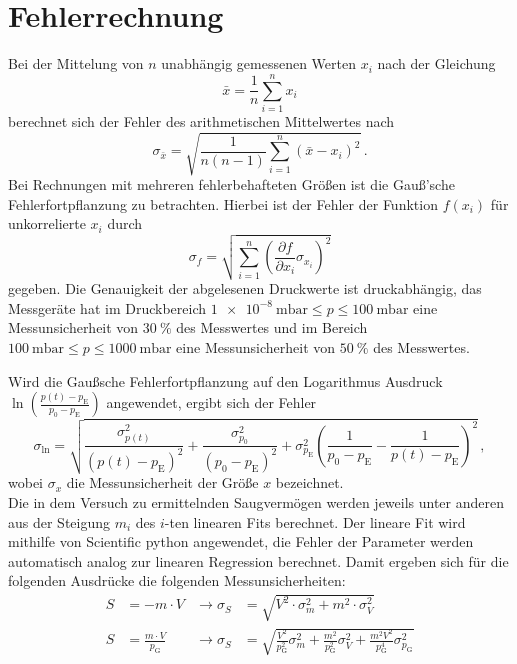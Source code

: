 \section{Fehlerrechnung}
\label{sec:fehler}

\noindent Bei der Mittelung von $n$ unabhängig gemessenen Werten $x_i$ nach der Gleichung 
\begin{equation*}
    \bar{x} = \frac{1}{n} \sum_{i=1}^n x_i
\end{equation*}
berechnet sich der Fehler des arithmetischen Mittelwertes nach
\begin{equation*}
    \sigma_{\bar{x}} = \sqrt{\frac{1}{n(n-1)}\sum_{i=1}^n \left( \bar{x} - x_i \right)^2}\, .
\end{equation*} 
Bei Rechnungen mit mehreren fehlerbehafteten Größen ist die Gauß'sche Fehlerfortpflanzung zu betrachten. Hierbei ist der Fehler der Funktion $f(x_i)$ 
für unkorrelierte $x_i$  durch
\begin{equation}
    \sigma_f = \sqrt{\sum_{i=1}^n \left(\frac{\partial f}{\partial x_i} \sigma_{x_i}\right)^2}
    \label{eqn:gauss}
\end{equation}
gegeben.
Die Genauigkeit der abgelesenen Druckwerte ist druckabhängig, das Messgeräte hat im Druckbereich $ \SI{1e-8}{\milli\bar} \leq p \leq \SI{100}{\milli\bar}$ eine Messunsicherheit von 
$\SI{30}{\percent}$ des Messwertes und im Bereich $\SI{100}{\milli\bar} \leq p \leq \SI{1000}{\milli\bar}$ eine Messunsicherheit von $\SI{50}{\percent}$ des Messwertes. 

\noindent Wird die Gaußsche Fehlerfortpflanzung auf den Logarithmus Ausdruck $\ln\left(\frac{p(t) - p_\text{E}}{p_0 - p_\text{E}}\right)$ angewendet, 
ergibt sich der Fehler 
\begin{equation}
    \sigma_{\ln} =\sqrt{\frac{\sigma^2_{p(t)}}{\left(p(t) - p_\text{E}\right)^2} + \frac{\sigma^2_{p_0}}{\left(p_0 - p_\text{E}\right)^2} 
                    + \sigma^2_{p_\text{E}} \left(\frac{1}{p_0 - p_\text{E}} - \frac{1}{p(t) - p_\text{E}}\right)^2 }\, , 
    \label{eqn:err_ln}
\end{equation}
wobei $\sigma_x$ die Messunsicherheit der Größe $x$ bezeichnet.\\
Die in dem Versuch zu ermittelnden Saugvermögen werden jeweils unter anderen aus der Steigung $m_i$ des $i$-ten linearen Fits berechnet. 
Der lineare Fit wird mithilfe von Scientific python \cite{numpy} angewendet, die Fehler der Parameter werden automatisch analog zur linearen Regression berechnet. 
Damit ergeben sich für die folgenden Ausdrücke die folgenden Messunsicherheiten:
\begin{align}
    S &= - m \cdot V & \rightarrow \sigma_S &= \sqrt{V^2\cdot \sigma_m^2 + m^2 \cdot \sigma_V^2} \label{eqn:err_saug_eva}\\
    S &= \frac{m\cdot V}{p_\text{G}} & \rightarrow \sigma_S &= \sqrt{\frac{V^2}{p_\text{G}^2} \sigma_m^2 + \frac{m^2}{p_\text{G}^2} \sigma_V^2 + \frac{m^2V^2}{p_\text{G}^4} \sigma_{p_{\text{G}}}^2 } \label{eqn:err_saug_leck}
\end{align}